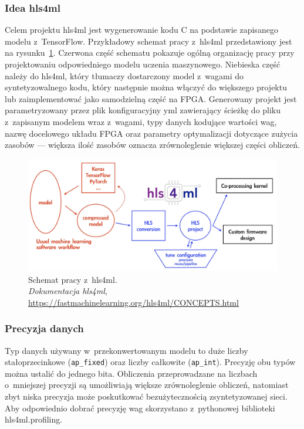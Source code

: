 \documentclass[12pt, oneside, a4paper]{article}
\def\CPP{{C\nolinebreak[4]\hspace{-.05em}\raisebox{.4ex}{\tiny\bf ++}}}
\begin{document}
\subsubsection{Idea hls4ml}\label{sec:Idea hls4ml}
Celem projektu hls4ml jest wygenerowanie kodu \CPP{} na podstawie zapisanego
modelu z~TensorFlow. Przykładowy schemat pracy z~hls4ml przedstawiony jest
na rysunku~\ref{fig:hls4ml}.
Czerwona część schematu pokazuje ogólną organizację pracy przy projektowaniu 
odpowiedniego modelu uczenia maszynowego. Niebieska część należy do hls4ml,
który tłumaczy dostarczony model z~wagami do syntetyzowalnego kodu, który
następnie można włączyć do większego projektu lub zaimplementować jako
samodzielną część na FPGA. Generowany projekt jest parametryzowany
przez plik konfiguracyjny yml zawierający ścieżkę do pliku z~zapisanym modelem
wraz z~wagami, typy danych kodujące wartości wag, nazwę docelowego układu FPGA
oraz parametry optymalizacji dotyczące zużycia zasobów --- większa ilość
zasobów oznacza zrównoleglenie większej części obliczeń.
\begin{figure}[h]
  \centering
  \includegraphics[width=0.95\linewidth]{figures/hls4ml.jpg}
  \caption{Schemat pracy z~hls4ml. \\
  \textit{Dokumentacja hls4ml},
  \url{https://fastmachinelearning.org/hls4ml/CONCEPTS.html}}\label{fig:hls4ml}
\end{figure}

\subsubsection{Precyzja danych}\label{sec:Precyzja danych}
Typ danych używany w~przekonwertowanym modelu to duże liczby
stałoprzecinkowe (\lstinline{ap_fixed}) oraz liczby całkowite
(\lstinline{ap_int}).
Precyzję obu typów można ustalić do jednego bita.
Obliczenia przeprowadzane na liczbach o~mniejszej
precyzji są umożliwiają większe zrównoleglenie obliczeń,
natomiast zbyt niska precyzja może poskutkować
bezużytecznością zsyntetyzowanej sieci. Aby odpowiednio dobrać precyzję
wag skorzystano z~pythonowej biblioteki hls4ml.profiling.
\end{document}
